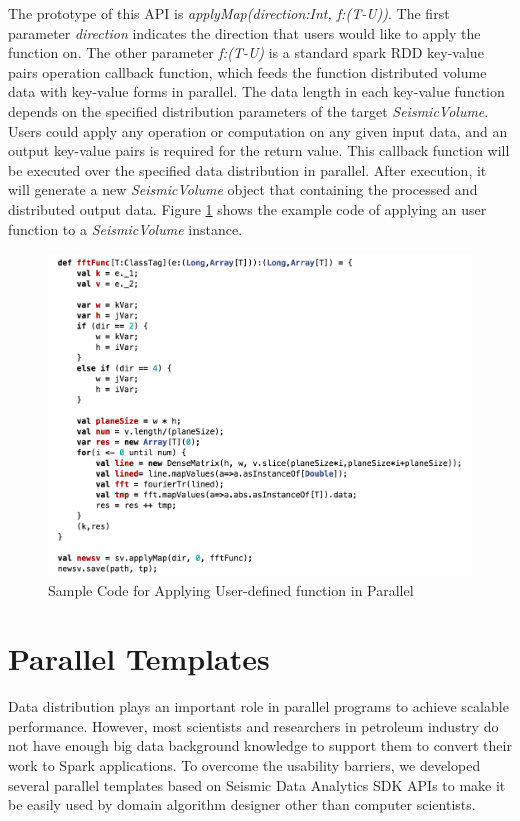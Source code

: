 The prototype of this API is \emph{applyMap(direction:Int, f:(T-U))}. The first parameter \emph{direction} indicates the direction that users would like to apply the function on. The other parameter \emph{f:(T-U)} is a standard spark RDD key-value pairs operation callback function, which feeds the function distributed volume data with key-value forms in parallel. The data length in each key-value function depends on the specified distribution parameters of the target \emph{SeismicVolume}.  Users could apply any operation or computation on any given input data, and an output key-value pairs is required for the return value. This callback function will be executed over the specified data distribution in parallel. After execution, it will generate a new \emph{SeismicVolume} object that containing the processed and distributed output data.  Figure \ref{code_apply} shows the example code of applying an user function to a \emph{SeismicVolume} instance.

\begin{figure}[h]
\centering
\includegraphics[scale=0.65]{figures/code_apply.png}
\caption{Sample Code for Applying User-defined function in Parallel}
\label{code_apply}
\end{figure}


\section{Parallel Templates}

Data distribution plays an important role in parallel programs to achieve scalable performance. However, most scientists and researchers in petroleum industry do not have enough big data background knowledge to support them to convert their work to Spark applications. To overcome the usability barriers, we developed several parallel templates based on Seismic Data Analytics SDK APIs to make it be easily used by domain algorithm designer other than computer scientists.

